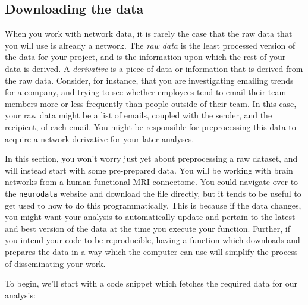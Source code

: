 \subsection{Downloading the data}

When you work with network data, it is rarely the case that the {raw data} that you will use is already a network. The \textit{raw data} is the least processed version of the data for your project, and is the information upon which the rest of your data is {derived}. A \textit{derivative} is a piece of data or information that is {derived} from the raw data. Consider, for instance, that you are investigating emailing trends for a company, and trying to see whether employees tend to email their team members more or less frequently than people outside of their team. In this case, your raw data might be a list of emails, coupled with the sender, and the recipient, of each email. You might be responsible for {preprocessing} this data to acquire a network derivative for your later analyses.

In this section, you won't worry just yet about preprocessing a raw dataset, and will instead start with some pre-prepared data. You will be working with brain networks from a human functional MRI connectome. You could navigate over to the \texttt{neurodata} website and download the file directly, but it tends to be useful to get used to how to do this programmatically. This is because if the data changes, you might want your analysis to automatically update and pertain to the latest and best version of the data at the time you execute your function. Further, if you intend your code to be reproducible, having a function which downloads and prepares the data in a way which the computer can use will simplify the process of disseminating your work. 

To begin, we'll start with a code snippet which fetches the required data for our analysis:

